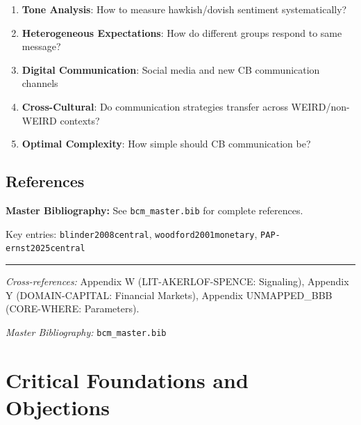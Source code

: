 \begin{enumerate}
  \item \textbf{Tone Analysis}: How to measure hawkish/dovish sentiment systematically?
  \item \textbf{Heterogeneous Expectations}: How do different groups respond to same message?
  \item \textbf{Digital Communication}: Social media and new CB communication channels
  \item \textbf{Cross-Cultural}: Do communication strategies transfer across WEIRD/non-WEIRD contexts?
  \item \textbf{Optimal Complexity}: How simple should CB communication be?
\end{enumerate}

\subsection{References}

\begin{tcolorbox}[colback=blue!5!white, colframe=blue!75!black]
\textbf{Master Bibliography:} See \texttt{bcm\_master.bib} for complete references.

Key entries: \texttt{blinder2008central}, \texttt{woodford2001monetary}, \texttt{PAP-ernst2025central}
\end{tcolorbox}

\vspace{1em}
\hrule
\vspace{0.5em}

\noindent\textit{Cross-references:}
Appendix W (LIT-AKERLOF-SPENCE: Signaling),
Appendix Y (DOMAIN-CAPITAL: Financial Markets),
Appendix UNMAPPED_BBB (CORE-WHERE: Parameters).

\noindent\textit{Master Bibliography:} \texttt{bcm\_master.bib}



\section{Critical Foundations and Objections}
\label{sec:bl-foundations}

